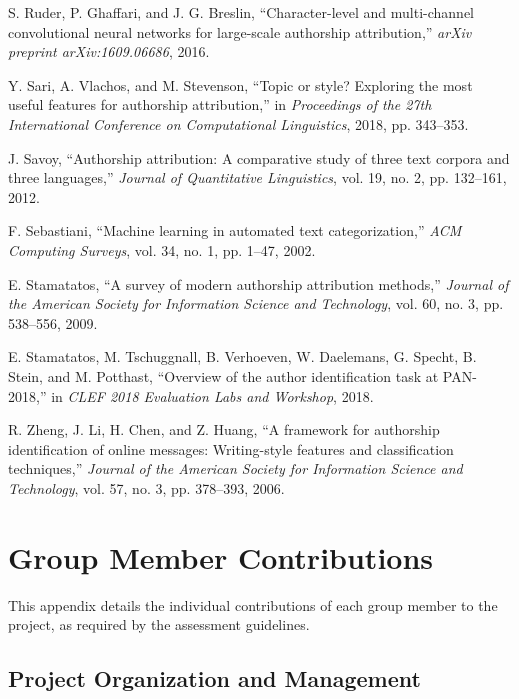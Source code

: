 \documentclass[11pt,a4paper]{article}
\begin{document}
\begin{thebibliography}{99}
S. Ruder, P. Ghaffari, and J. G. Breslin, ``Character-level and multi-channel convolutional neural networks for large-scale authorship attribution,'' \textit{arXiv preprint arXiv:1609.06686}, 2016.

Y. Sari, A. Vlachos, and M. Stevenson, ``Topic or style? Exploring the most useful features for authorship attribution,'' in \textit{Proceedings of the 27th International Conference on Computational Linguistics}, 2018, pp. 343--353.

J. Savoy, ``Authorship attribution: A comparative study of three text corpora and three languages,'' \textit{Journal of Quantitative Linguistics}, vol. 19, no. 2, pp. 132--161, 2012.

F. Sebastiani, ``Machine learning in automated text categorization,'' \textit{ACM Computing Surveys}, vol. 34, no. 1, pp. 1--47, 2002.

E. Stamatatos, ``A survey of modern authorship attribution methods,'' \textit{Journal of the American Society for Information Science and Technology}, vol. 60, no. 3, pp. 538--556, 2009.

E. Stamatatos, M. Tschuggnall, B. Verhoeven, W. Daelemans, G. Specht, B. Stein, and M. Potthast, ``Overview of the author identification task at PAN-2018,'' in \textit{CLEF 2018 Evaluation Labs and Workshop}, 2018.

R. Zheng, J. Li, H. Chen, and Z. Huang, ``A framework for authorship identification of online messages: Writing-style features and classification techniques,'' \textit{Journal of the American Society for Information Science and Technology}, vol. 57, no. 3, pp. 378--393, 2006.

\end{thebibliography}

\newpage
\appendix

\section{Group Member Contributions}

This appendix details the individual contributions of each group member to the project, as required by the assessment guidelines.

\subsection{Project Organization and Management}
\end{document}
